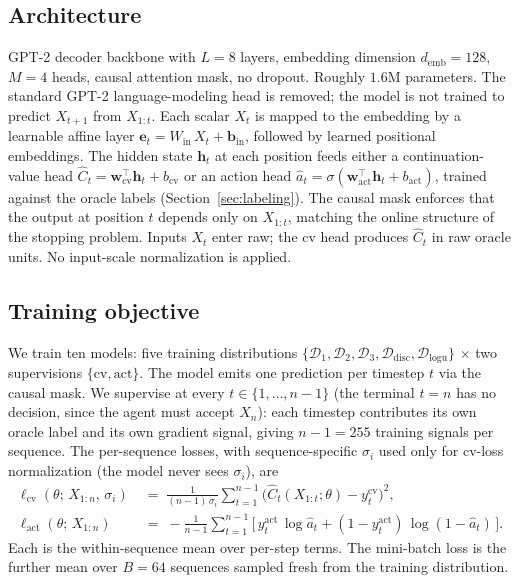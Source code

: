 \documentclass[11pt]{article}
\begin{document}
\subsection{Architecture}

GPT-2 decoder backbone with $L = 8$ layers, embedding dimension $d_{\mathrm{emb}} = 128$, $M = 4$ heads, causal attention mask, no dropout. Roughly $1.6$M parameters. The standard GPT-2 language-modeling head is removed; the model is not trained to predict $X_{t+1}$ from $X_{1:t}$. Each scalar $X_t$ is mapped to the embedding by a learnable affine layer $\mathbf{e}_t = W_{\mathrm{in}}\, X_t + \mathbf{b}_{\mathrm{in}}$, followed by learned positional embeddings. The hidden state $\mathbf{h}_t$ at each position feeds either a continuation-value head $\widehat C_t = \mathbf{w}_{\mathrm{cv}}^\top \mathbf{h}_t + b_{\mathrm{cv}}$ or an action head $\hat a_t = \sigma(\mathbf{w}_{\mathrm{act}}^\top \mathbf{h}_t + b_{\mathrm{act}})$, trained against the oracle labels (Section~\ref{sec:labeling}). The causal mask enforces that the output at position $t$ depends only on $X_{1:t}$, matching the online structure of the stopping problem. Inputs $X_t$ enter raw; the cv head produces $\widehat C_t$ in raw oracle units. No input-scale normalization is applied.

\subsection{Training objective}
\label{sec:training-objective}

We train ten models: five training distributions $\{\mathcal{D}_1, \mathcal{D}_2, \mathcal{D}_3, \mathcal{D}_{\mathrm{disc}}, \mathcal{D}_{\mathrm{logu}}\}$ $\times$ two supervisions $\{\text{cv}, \text{act}\}$. The model emits one prediction per timestep $t$ via the causal mask. We supervise at every $t \in \{1, \ldots, n-1\}$ (the terminal $t = n$ has no decision, since the agent must accept $X_n$): each timestep contributes its own oracle label and its own gradient signal, giving $n-1 = 255$ training signals per sequence. The per-sequence losses, with sequence-specific $\sigma_i$ used only for cv-loss normalization (the model never sees $\sigma_i$), are
\begin{align*}
\ell_{\mathrm{cv}}(\theta;\, X_{1:n},\, \sigma_i)
&\;=\; \frac{1}{(n-1)\,\sigma_i}\sum_{t=1}^{n-1}\!\Big(\widehat C_t(X_{1:t};\theta) - y_t^{\mathrm{cv}}\Big)^{\!2}, \\
\ell_{\mathrm{act}}(\theta;\, X_{1:n})
&\;=\; -\frac{1}{n-1}\sum_{t=1}^{n-1}\!\Big[\, y_t^{\mathrm{act}}\,\log \hat a_t + (1 - y_t^{\mathrm{act}})\,\log(1 - \hat a_t)\,\Big].
\end{align*}
Each is the within-sequence mean over per-step terms. The mini-batch loss is the further mean over $B = 64$ sequences sampled fresh from the training distribution.
\end{document}
